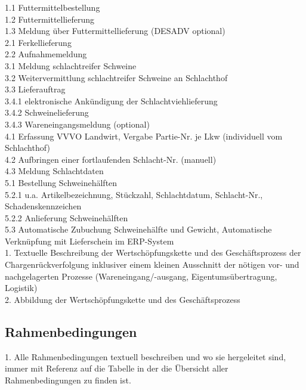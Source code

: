 1.1 Futtermittelbestellung\\
1.2 Futtermittellieferung\\
1.3 Meldung über Futtermittellieferung (DESADV optional)\\
2.1 Ferkellieferung\\
2.2 Aufnahmemeldung\\
3.1 Meldung schlachtreifer Schweine\\
3.2 Weitervermittlung schlachtreifer Schweine an Schlachthof\\
3.3 Lieferauftrag\\
3.4.1 elektronische Ankündigung der Schlachtviehlieferung\\
3.4.2 Schweinelieferung\\
3.4.3 Wareneingangsmeldung (optional)\\
4.1 Erfassung VVVO Landwirt, Vergabe Partie-Nr. je Lkw (individuell vom Schlachthof)\\
4.2 Aufbringen einer fortlaufenden Schlacht-Nr. (manuell)\\
4.3 Meldung Schlachtdaten\\
5.1 Bestellung Schweinehälften\\
5.2.1 u.a. Artikelbezeichnung, Stückzahl, Schlachtdatum, Schlacht-Nr., Schadenskennzeichen\\
5.2.2 Anlieferung Schweinehälften\\
5.3 Automatische Zubuchung Schweinehälfte und Gewicht, Automatische Verknüpfung mit Lieferschein im ERP-System\\

1. Textuelle Beschreibung der Wertschöpfungskette und des Geschäftsprozess der Chargenrückverfolgung inklusiver einem kleinen Ausschnitt der nötigen vor- und nachgelagerten Prozesse (Wareneingang/-ausgang, Eigentumsübertragung, Logistik)\\
2. Abbildung der Wertschöpfungskette und des Geschäftsprozess

\subsection{Rahmenbedingungen}
1. Alle Rahmenbedingungen textuell beschreiben und wo sie hergeleitet sind, immer mit Referenz auf die Tabelle in der die Übersicht aller Rahmenbedingungen zu finden ist.

